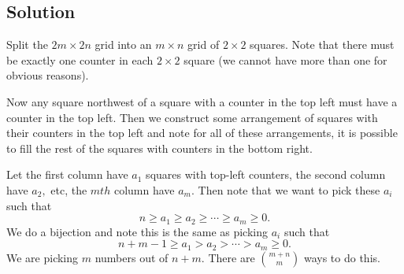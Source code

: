 \documentclass[mast]{lucky}
\begin{document}
\subsection{Solution}

Split the $2m\times 2n$ grid into an $m\times n$ grid of $2\times 2$ squares. Note that there must be exactly one counter in each $2\times 2$ square (we cannot have more than one for obvious reasons).
    
Now any square northwest of a square with a counter in the top left must have a counter in the top left. Then we construct some arrangement of squares with their counters in the top left and note for all of these arrangements, it is possible to fill the rest of the squares with counters in the bottom right.
    
Let the first column have $a_1$ squares with top-left counters, the second column have $a_2,$ etc, the $mth$ column have $a_m.$ Then note that we want to pick these $a_i$ such that
\[n\geq a_1\geq a_2\geq\cdots\geq a_m\geq 0.\]
We do a bijection and note this is the same as picking $a_i$ such that
\[n+m-1\geq a_1>a_2>\cdots>a_m\geq 0.\]
We are picking $m$ numbers out of $n+m.$ There are $\binom{m+n}{m}$ ways to do this.
\end{document}
